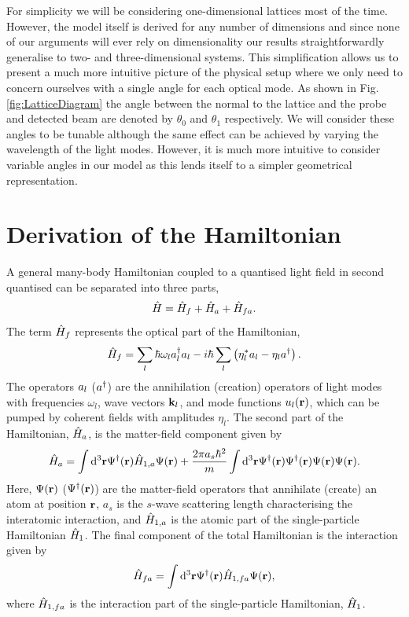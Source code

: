 For simplicity we will be considering one-dimensional lattices most of
the time. However, the model itself is derived for any number of
dimensions and since none of our arguments will ever rely on
dimensionality our results straightforwardly generalise to two- and
three-dimensional systems. This simplification allows us to present a
much more intuitive picture of the physical setup where we only need
to concern ourselves with a single angle for each optical mode. As
shown in Fig. \ref{fig:LatticeDiagram} the angle between the normal to
the lattice and the probe and detected beam are denoted by $\theta_0$
and $\theta_1$ respectively. We will consider these angles to be
tunable although the same effect can be achieved by varying the
wavelength of the light modes. However, it is much more intuitive to
consider variable angles in our model as this lends itself to a
simpler geometrical representation.

\section{Derivation of the Hamiltonian}
\label{sec:derivation}

A general many-body Hamiltonian coupled to a quantised light field in
second quantised can be separated into three parts,
\begin{equation}
\label{eq:FullH}
  \hat{H} = \hat{H}_f + \hat{H}_a + \hat{H}_{fa}.
\end{equation}
The term $\hat{H}_f$ represents the optical part of the Hamiltonian,
\begin{equation}
\label{eq:Hf}
  \hat{H}_f = \sum_l \hbar \omega_l a^\dagger_l a_l -
  i \hbar \sum_l \left( \eta_l^* a_l - \eta_l a^\dagger \right).
\end{equation}
The operators $a_l$ ($a^\dagger$) are the annihilation (creation) operators
of light modes with frequencies $\omega_l$, wave vectors $\mathbf{k}_l$,
and mode functions $u_l(\mathbf{r})$, which can be pumped by coherent
fields with amplitudes $\eta_l$. The second part of the Hamiltonian,
$\hat{H}_a$, is the matter-field component given by
\begin{equation}
\label{eq:Ha}
  \hat{H}_a = \int \mathrm{d}^3 \mathbf{r} \Psi^\dagger(\mathbf{r}) \hat{H}_{1,a}
  \Psi(\mathbf{r}) + \frac{2 \pi a_s \hbar^2}{m} \int \mathrm{d}^3 \mathbf{r}
  \Psi^\dagger(\mathbf{r}) \Psi^\dagger(\mathbf{r}) \Psi(\mathbf{r}) \Psi(\mathbf{r}).
\end{equation}
Here, $\Psi(\mathbf{r})$ ($\Psi^\dagger(\mathbf{r})$) are the matter-field
operators that annihilate (create) an atom at position $\mathbf{r}$, $a_s$
is the $s$-wave scattering length characterising the interatomic
interaction, and $\hat{H}_{1,a}$ is the atomic part of the single-particle
Hamiltonian $\hat{H}_1$. The final component of the total Hamiltonian is
the interaction given by 
\begin{equation}
  \label{eq:Hfa}
  \hat{H}_{fa} = \int \mathrm{d}^3 \mathbf{r} \Psi^\dagger(\mathbf{r}) \hat{H}_{1,fa}
  \Psi(\mathbf{r}),
\end{equation}
where $\hat{H}_{1,fa}$ is the interaction part of the single-particle
Hamiltonian, $\hat{H}_1$.

